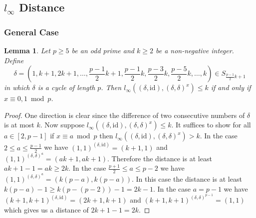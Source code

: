 \documentclass{article}
\newtheorem{lemma}{Lemma}
\begin{document}
\subsection{$l_\infty$ Distance}
\subsubsection{General Case}
\begin{lemma}\label{pkinftyleqk}
Let $p \geq 5$ be an odd prime and $k \geq 2$ be a non-negative integer. Define
\begin{displaymath}
\delta = (1, k+1, 2k+1, \dots, \frac{p-1}{2}k+1, \frac{p-1}{2}k, \frac{p-3}{2}k, \frac{p-5}{2}k, \dots, k) \in S_{\frac{p-1}{2}k+1}
\end{displaymath}
in which $\delta$ is a cycle of length $p$. Then $l_\infty((\delta, \mathrm{id}), (\delta, \delta)^x) \leq k$ if and only if $x \equiv 0,1 \bmod p$.
\end{lemma}
\begin{proof}
One direction is clear since the difference of two consecutive numbers of $\delta$ is at most $k$. Now suppose $l_\infty((\delta, \mathrm{id}), (\delta, \delta)^x) \leq k$. It suffices to show for all $a \in [2,p-1]$ if $x \equiv a \bmod p$ then $l_\infty((\delta, \mathrm{id}), (\delta, \delta)^x) > k$. In the case $2 \leq a \leq \frac{p-1}{2}$ we have $(1,1)^{(\delta, \mathrm{id})} = (k+1,1)$ and $(1,1)^{(\delta, \delta)^a} = (ak+1,ak+1)$. Therefore the distance is at least $ak+1-1 = ak \geq 2k$. In the case $\frac{p+1}{2} \leq a \leq p-2$ we have $(1,1)^{(\delta, \delta)^a} = (k(p-a),k(p-a))$. In this case the distance is at least $k(p-a) - 1 \geq k(p-(p-2)) - 1 = 2k-1$. In the case $a=p-1$ we have $(k+1,k+1)^{(\delta, \mathrm{id})} = (2k+1,k+1)$ and $(k+1,k+1)^{(\delta, \delta)^{p-1}} = (1,1)$ which gives us a distance of $2k+1-1 = 2k$.
\end{proof}
\end{document}
